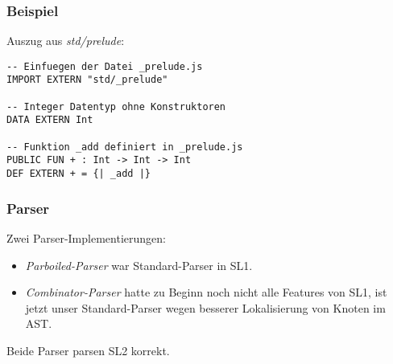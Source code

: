 \begin{frame}[containsverbatim=true]
\frametitle{Beispiel}
Auszug aus \emph{std/prelude}:
\begin{lstlisting}
-- Einfuegen der Datei _prelude.js
IMPORT EXTERN "std/_prelude"

-- Integer Datentyp ohne Konstruktoren
DATA EXTERN Int

-- Funktion _add definiert in _prelude.js
PUBLIC FUN + : Int -> Int -> Int
DEF EXTERN + = {| _add |}
\end{lstlisting}
\end{frame}

\begin{frame}
\frametitle{Parser}
Zwei Parser-Implementierungen:
\begin{itemize}
\item \emph{Parboiled-Parser} war Standard-Parser in SL1.
\item\emph{Combinator-Parser} hatte zu Beginn noch nicht
alle Features von SL1, ist jetzt unser Standard-Parser
wegen besserer Lokalisierung von Knoten im AST.
\end{itemize}
Beide Parser parsen SL2 korrekt.
\end{frame}

